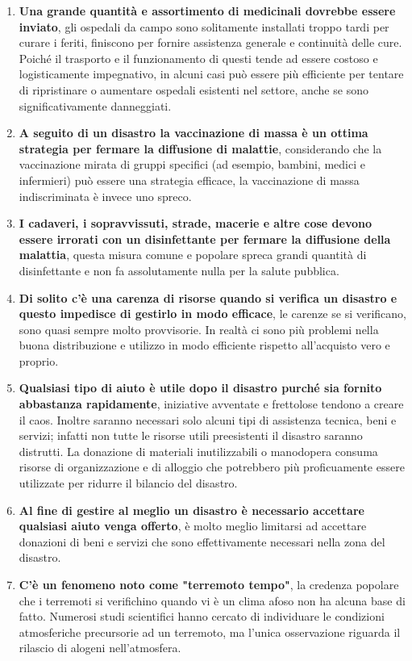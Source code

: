 \begin{enumerate}
 \item\textbf{Una grande quantità e assortimento di medicinali dovrebbe essere inviato},  gli ospedali da campo sono solitamente installati troppo tardi per curare i feriti, finiscono per fornire assistenza generale e continuità delle cure. Poiché il trasporto e il funzionamento di questi tende ad essere costoso e logisticamente impegnativo, in alcuni casi può essere più efficiente per tentare di ripristinare o aumentare ospedali esistenti nel settore, anche se sono significativamente danneggiati.
 \item\textbf{A seguito di un disastro la vaccinazione di massa è un ottima strategia per fermare la diffusione di malattie},  considerando che la vaccinazione mirata di gruppi specifici (ad esempio, bambini, medici e infermieri) può essere una strategia efficace, la vaccinazione di massa indiscriminata è invece uno spreco.
 \item\textbf{I cadaveri, i sopravvissuti, strade, macerie e altre cose devono essere irrorati con un disinfettante per fermare la diffusione della malattia}, questa misura comune e popolare spreca grandi quantità di disinfettante e non fa assolutamente nulla per la salute pubblica.
 \item\textbf{Di solito c'è una carenza di risorse quando si verifica un disastro e questo impedisce di gestirlo in modo efficace}, le carenze se si verificano, sono quasi sempre molto provvisorie. In realtà ci sono più problemi nella buona distribuzione e utilizzo in modo efficiente rispetto all'acquisto vero e proprio.
\item\textbf{Qualsiasi tipo di aiuto è utile dopo il disastro purché sia fornito abbastanza rapidamente}, iniziative avventate e frettolose tendono a creare il caos. Inoltre saranno necessari solo alcuni tipi di assistenza tecnica, beni e servizi; infatti non tutte le risorse utili preesistenti il disastro saranno distrutti. La donazione di materiali inutilizzabili o manodopera consuma risorse di organizzazione e di alloggio che potrebbero più proficuamente essere utilizzate per ridurre il bilancio del disastro.
\item\textbf{Al fine di gestire al meglio un disastro è necessario accettare qualsiasi aiuto venga offerto}, è molto meglio limitarsi ad accettare donazioni di beni e servizi che sono effettivamente necessari nella zona del disastro.
\item\textbf{C'è un fenomeno noto come "terremoto tempo"}, la credenza popolare che i terremoti si verifichino quando vi è un clima afoso non ha alcuna base di fatto. Numerosi studi scientifici hanno cercato di individuare le condizioni atmosferiche precursorie ad un terremoto, ma l'unica osservazione riguarda il rilascio di alogeni nell'atmosfera.

\end{enumerate}
